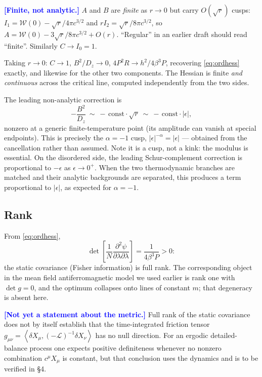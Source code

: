 \documentclass[11pt,a4paper]{article}
\newcommand{\avg}[1]{\left\langle #1 \right\rangle}
\newcommand{\Wc}{\mathcal{W}}
\newcommand{\FLAG}[1]{\textcolor{blue}{\textbf{[#1]}}}
\newcommand{\avg}[1]{\left\langle #1 \right\rangle}
\newcommand{\Wc}{\mathcal{W}}
\newcommand{\FLAG}[1]{\textcolor{blue}{\textbf{[#1]}}}
\begin{document}
\FLAG{Finite, not analytic.} $A$ and $B$ are \emph{finite} as $r\to0$ but carry
$O(\sqrt r)$ cusps:  $I_1=\Wc(0)-\sqrt r/4\pi c^{3/2}$ and
$rI_2=\sqrt r/8\pi c^{3/2}$, so $A=\Wc(0)-3\sqrt r/8\pi c^{3/2}+O(r)$. ``Regular'' in an
earlier draft should read ``finite''. Similarly $C\to I_0=1$.

Taking $r\to0$: $C\to1$, $B^2/D_z\to0$, $4P^2R\to h^2/4\beta^3P$, recovering
\eqref{eq:ordhess} exactly, and likewise for the other two components.  The
Hessian is finite \emph{and continuous} across the critical line, computed independently
from the two sides.

The leading non-analytic correction is
\begin{equation}
  -\frac{B^2}{D_z}\ \sim\ -\,\mathrm{const}\cdot\sqrt r\ \sim\ -\,\mathrm{const}\cdot|\epsilon| ,
\end{equation}
nonzero at a generic finite-temperature point (its amplitude can vanish at special
endpoints). This is precisely the $\alpha=-1$ cusp, $|\epsilon|^{-\alpha}=|\epsilon|$ ---
obtained from the cancellation rather than assumed. Note it is a cusp, not a kink: the
modulus is essential.
On the disordered side, the leading Schur-complement correction is proportional to $-\epsilon$ as $\epsilon \to 0^+$. When the two thermodynamic branches are matched and their analytic backgrounds are separated, this produces a term proportional to $|\epsilon|$, as expected for $\alpha=-1$.

\subsection{Rank}
\label{sec:rank}
From \eqref{eq:ordhess},
\begin{equation}
  \det\left[\frac{1}{N}\frac{\partial^2\psi}{\partial\lambda\partial\lambda}\right]
  =\frac{1}{4\beta^3P}>0 :
\end{equation}
the static covariance (Fisher information) is full rank. The corresponding
object in the mean field antiferromagnetic model we used earlier is rank one with $\det g=0$, and the optimum collapses onto lines of constant $m$;
that degeneracy is absent here.

\FLAG{Not yet a statement about the metric.} Full rank of the static covariance does not by
itself establish that the time-integrated friction tensor
$g_{\mu\nu}=\avg{\delta X_\mu,(-\mathcal L)^{-1}\delta X_\nu}$ has no null direction. For an
ergodic detailed-balance process one expects positive definiteness whenever no nonzero
combination $c^\mu X_\mu$ is constant, but that conclusion uses the dynamics and is to be
verified in \S4.
\end{document}
